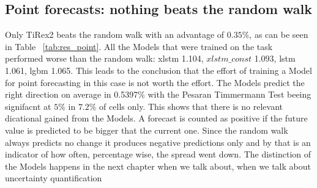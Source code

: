 \subsection{Point forecasts: nothing beats the random walk}
\label{sec:res:point}
Only TiRex2 beats the random walk with an advantage of $0.35\%$, as can be seen in Table ~\ref{tab:res_point}. All the Models that were trained on the task performed worse than the random walk: xlstm 1.104, $xlstm\_const$ 1.093, lstm 1.061, lgbm 1.065. This leads to the conclusion that the effort of training a Model for point forecasting in this case is not worth the effort. The Models predict the right direction on average in 0.5397$\%$ with the Pesaran Timmermann Test beeing signifacnt at $5\%$ in $7.2\%$ of cells only. This shows that there is no relevant dicational gained from the Models. A forecast is counted as positive if the future value is predicted to be bigger that the current one. Since the random walk always predicts no change it produces negative predictions only and by that is an indicator of how often, percentage wise, the spread went down. The distinction of the Models happens in the next chapter when we talk about, when we talk about uncertainty quantification
